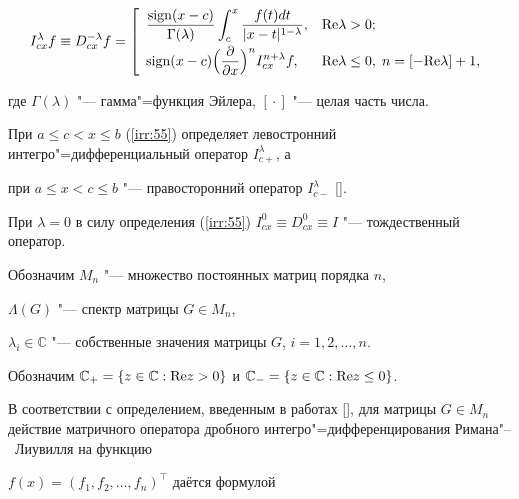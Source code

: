 \begin{equation} \label{irr:55}

I^{\lambda}_{cx}f\equiv D^{-\lambda}_{cx}f=

\left[\begin{array}{ll}

\displaystyle

\frac{{\rm sign}(x-c)}{\Gamma(\lambda)}\int _{c}^{x}\frac{f(t)dt}{|x-t|^{1-\lambda}}, &

{\rm {\rm Re}}\lambda>0; \vspace{1mm} \\

\displaystyle

{\rm sign}(x-c)\Bigl(\frac{\partial}{\partial x}\Bigr)^{n}I^{n+\lambda}_{cx}f, & {\rm

{\rm Re}}\lambda\leq0, \; n=[-{\rm {\rm Re}}\lambda]+1,

\end{array}\right.

\end{equation}

где $\Gamma(\lambda)$ "--- гамма"=функция Эйлера, $[{}\cdot{}]$ "--- целая часть числа. 

При \mbox{$a\leq c<x\leq b$} (\ref{irr:55}) определяет левостронний интегро"=дифференциальный оператор $I^{\lambda}_{c+}$, а

при $a\leq x<c\leq b$ "--- правосторонний оператор $I^{\lambda}_{c-}$ []. 

При $\lambda=0$ в силу определения (\ref{irr:55}) $I^{0}_{cx}\equiv D^{0}_{cx}\equiv I$ "--- тождественный оператор.



Обозначим $M_{n}$ "--- множество постоянных матриц порядка $n$,

$\Lambda(G)$ "--- спектр матрицы $G \in M_{n}$, 

$\lambda_{i}\in \mathbb C $ "--- собственные значения матрицы $G$, $i=1, 2, \dots, n$. 

Обозначим $\mathbb C_{+}=\{z \in \mathbb C : {\rm Re} z>0 \}$ и $\mathbb C_{-}=\{z \in \mathbb C: {\rm Re} z\leq 0\}$.



В соответствии с определением, введенным в работах [], для матрицы $G \in

M_{n}$ действие матричного оператора дробного интегро"=дифференцирования Римана"--~Лиувилля на функцию

$f(x)=(f_{1}, f_{2}, \dots, f_{n})^{\top}$ даётся формулой


